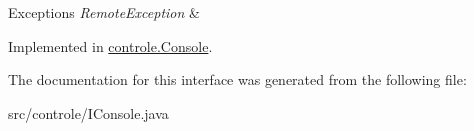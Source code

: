 \begin{DoxyExceptions}{Exceptions}
{\em Remote\-Exception} & \\
\hline
\end{DoxyExceptions}


Implemented in \hyperlink{classcontrole_1_1_console_a67a69e366628189229f757915169de2e}{controle.\-Console}.



The documentation for this interface was generated from the following file\-:\begin{DoxyCompactItemize}
\item 
src/controle/I\-Console.\-java\end{DoxyCompactItemize}
